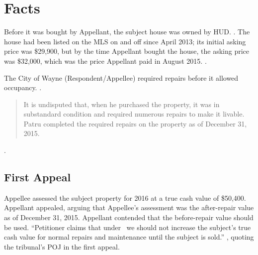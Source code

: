 \documentclass[12pt,\documentclassflag]{michiganCourtOfAppealsBrief}
\begin{document}
 


\section{Facts}
\label{facts}

Before it was bought by Appellant, the subject house was owned by HUD.
\mlsListing[]. 
The house had been listed on the MLS on and off since April 2013;
its initial asking price was \$29,900,
but by the time Appellant bought the house, the asking price was \$32,000,
which was the price Appellant paid in August 2015. \mlsHistory[].

The City of Wayne (Respondent/Appellee) required repairs before it allowed occupancy. %
\repairs.

\begin{quote}
  It is undisputed that, when he purchased the property, it was in substandard condition and required numerous repairs to make it livable. Patru completed the required repairs on the property as of December 31, 2015.
\end{quote}
.

\subsection{First Appeal}

Appellee assessed the subject property for 2016 at a true cash value of \$50,400. Appellant appealed, arguing that Appellee's assessment was the after-repair value as of December 31, 2015.
Appellant contended that the before-repair value should be used. 
``Petitioner claims that under \mathieuGast\ we should not increase the subject's true cash value for normal repairs and maintenance until the subject is sold.'' , quoting the tribunal's POJ in the first appeal.
\end{document}
